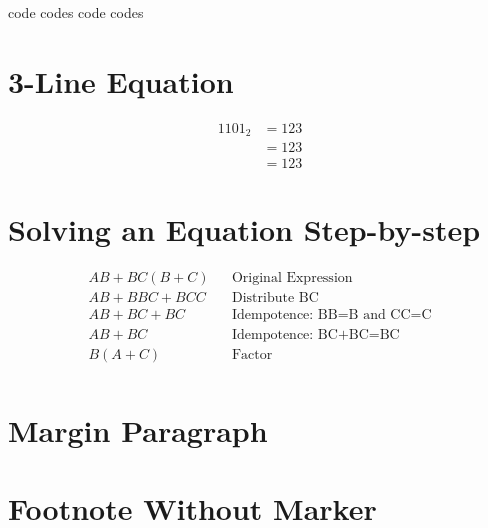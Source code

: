 \gls{code} %
\glspl{code} %
\Gls{code} %
\Glspl{code} %


\section{3-Line Equation}
\begin{align}
	\label{03:eq:identity_example}
	1101_2 &= 123 \\
	\nonumber
	&= 123 \\
	\nonumber
	&= 123
\end{align}


\section{Solving an Equation Step-by-step}
\begin{align}
	\label{04:soln:solving_equation_one}
	AB+BC(B+C) && \text{Original Expression} \\
	\nonumber
	AB+BBC+BCC && \text{Distribute BC} \\
	\nonumber
	AB+BC+BC && \text{Idempotence: BB=B and CC=C} \\
	\nonumber
	AB+BC && \text{Idempotence: BC+BC=BC} \\
	\nonumber
	B(A+C) && \text{Factor} \\
\end{align}

\section{Margin Paragraph} 

\section{Footnote Without Marker} 

